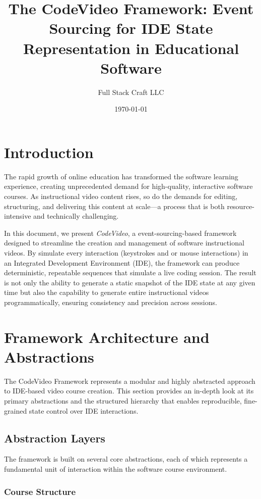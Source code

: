 \documentclass[11pt, a4paper]{article}
\title{The CodeVideo Framework: Event Sourcing for IDE State Representation in Educational Software}
\author{Full Stack Craft LLC}
\date{\today}
\begin{document}
\maketitle
\tableofcontents
\newpage

\section{Introduction}
The rapid growth of online education has transformed the software learning experience, creating unprecedented demand for high-quality, interactive software courses. As instructional video content rises, so do the demands for editing, structuring, and delivering this content at scale—a process that is both resource-intensive and technically challenging.

In this document, we present \textit{CodeVideo}, a event-sourcing-based framework designed to streamline the creation and management of software instructional videos. By simulate every interaction (keystrokes and or mouse interactions) in an Integrated Development Environment (IDE), the framework can produce deterministic, repeatable sequences that simulate a live coding session. The result is not only the ability to generate a static snapshot of the IDE state at any given time but also the capability to generate entire instructional videos programmatically, ensuring consistency and precision across sessions.

\section{Framework Architecture and Abstractions}

The CodeVideo Framework represents a modular and highly abstracted approach to IDE-based video course creation. This section provides an in-depth look at its primary abstractions and the structured hierarchy that enables reproducible, fine-grained state control over IDE interactions.

\subsection{Abstraction Layers}

The framework is built on several core abstractions, each of which represents a fundamental unit of interaction within the software course environment.

\subsubsection{Course Structure}
\end{document}
